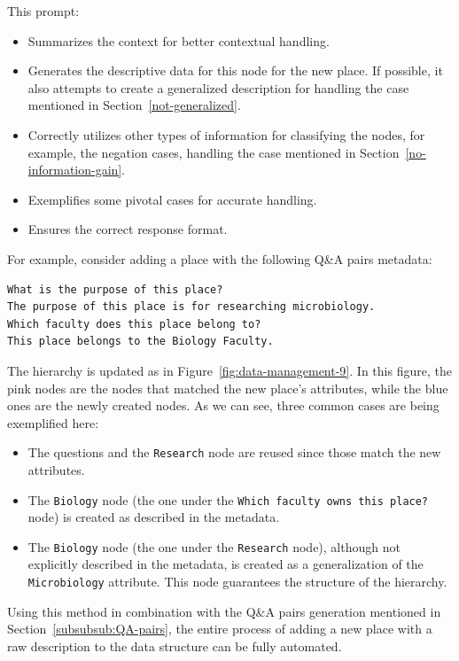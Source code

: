 This prompt:
\begin{itemize}
    \item Summarizes the context for better contextual handling.
    \item Generates the descriptive data for this node for the new place. If possible, it also attempts to create a generalized description for handling the case mentioned in Section~\ref{not-generalized}.
    \item Correctly utilizes other types of information for classifying the nodes, for example, the negation cases, handling the case mentioned in Section~\ref{no-information-gain}.
    \item Exemplifies some pivotal cases for accurate handling.
    \item Ensures the correct response format.
\end{itemize}

For example, consider adding a place with the following Q\&A pairs metadata:

\begin{lstlisting}[style=cSharp]
What is the purpose of this place?
The purpose of this place is for researching microbiology.
Which faculty does this place belong to?
This place belongs to the Biology Faculty.
\end{lstlisting}

The hierarchy is updated as in Figure~\ref{fig:data-management-9}. In this figure, the pink nodes are the nodes that matched the new place's attributes, while the blue ones are the newly created nodes. As we can see, three common cases are being exemplified here:
\begin{itemize}
\item The questions and the \texttt{Research} node are reused since those match the new attributes.
\item The \texttt{Biology} node (the one under the \texttt{Which faculty owns this place?} node) is created as described in the metadata.
\item The \texttt{Biology} node (the one under the \texttt{Research} node), although not explicitly described in the metadata, is created as a generalization of the \texttt{Microbiology} attribute. This node guarantees the structure of the hierarchy.
\end{itemize}

Using this method in combination with the Q\&A pairs generation mentioned in Section~\ref{subsubsub:QA-pairs}, the entire process of adding a new place with a raw description to the data structure can be fully automated.

